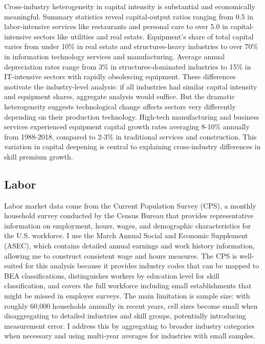 \documentclass[12pt]{article}
\begin{document}
Cross-industry heterogeneity in capital intensity is substantial and economically meaningful. Summary statistics reveal capital-output ratios ranging from 0.5 in labor-intensive services like restaurants and personal care to over 5.0 in capital-intensive sectors like utilities and real estate. Equipment's share of total capital varies from under 10\% in real estate and structures-heavy industries to over 70\% in information technology services and manufacturing. Average annual depreciation rates range from 3\% in structures-dominated industries to 15\% in IT-intensive sectors with rapidly obsolescing equipment. These differences motivate the industry-level analysis: if all industries had similar capital intensity and equipment shares, aggregate analysis would suffice. But the dramatic heterogeneity suggests technological change affects sectors very differently depending on their production technology. High-tech manufacturing and business services experienced equipment capital growth rates averaging 8-10\% annually from 1988-2018, compared to 2-3\% in traditional services and construction. This variation in capital deepening is central to explaining cross-industry differences in skill premium growth.


\subsection{Labor}\label{sec:labor_data}

Labor market data come from the Current Population Survey (CPS), a monthly household survey conducted by the Census Bureau that provides representative information on employment, hours, wages, and demographic characteristics for the U.S. workforce. I use the March Annual Social and Economic Supplement (ASEC), which contains detailed annual earnings and work history information, allowing me to construct consistent wage and hours measures. The CPS is well-suited for this analysis because it provides industry codes that can be mapped to BEA classifications, distinguishes workers by education level for skill classification, and covers the full workforce including small establishments that might be missed in employer surveys. The main limitation is sample size: with roughly 60,000 households annually in recent years, cell sizes become small when disaggregating to detailed industries and skill groups, potentially introducing measurement error. I address this by aggregating to broader industry categories when necessary and using multi-year averages for industries with small samples.
\end{document}
